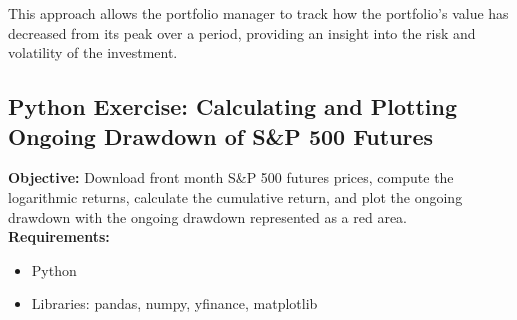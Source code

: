 \documentclass{article}
\begin{document}
This approach allows the portfolio manager to track how the portfolio's value has decreased from its peak over a period, providing an insight into the risk and volatility of the investment.

\subsection{Python Exercise: Calculating and Plotting Ongoing Drawdown of S\&P 500 Futures}

\textbf{Objective:} Download front month S\&P 500 futures prices, compute the logarithmic returns, calculate the cumulative return, and plot the ongoing drawdown with the ongoing drawdown represented as a red area. \\

\textbf{Requirements:}
\begin{itemize}
    \item Python
    \item Libraries: pandas, numpy, yfinance, matplotlib
\end{itemize}
\end{document}
